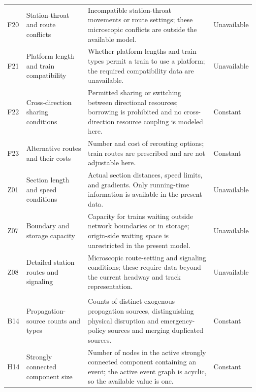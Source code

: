 \begin{longtable}{@{}>{\raggedright\arraybackslash}p{0.7cm}>{\raggedright\arraybackslash}p{3.0cm}>{\raggedright\arraybackslash}p{8.6cm}>{\raggedright\arraybackslash}p{1.9cm}@{}}
F20 & Station-throat and route conflicts & Incompatible station-throat movements or route settings; these microscopic conflicts are outside the available model. & Unavailable \\

F21 & Platform length and train compatibility & Whether platform lengths and train types permit a train to use a platform; the required compatibility data are unavailable. & Unavailable \\

F22 & Cross-direction sharing conditions & Permitted sharing or switching between directional resources; borrowing is prohibited and no cross-direction resource coupling is modeled here. & Constant \\

F23 & Alternative routes and their costs & Number and cost of rerouting options; train routes are prescribed and are not adjustable here. & Constant \\

Z01 & Section length and speed conditions & Actual section distances, speed limits, and gradients. Only running-time information is available in the present data. & Unavailable \\

Z07 & Boundary and storage capacity & Capacity for trains waiting outside network boundaries or in storage; origin-side waiting space is unrestricted in the present model. & Unavailable \\

Z08 & Detailed station routes and signaling & Microscopic route-setting and signaling conditions; these require data beyond the current headway and track representation. & Unavailable \\

\multicolumn{4}{@{}l}{\textbf{Delay propagation patterns}}\\*[2pt]

B14 & Propagation-source counts and types & Counts of distinct exogenous propagation sources, distinguishing physical disruption and emergency-policy sources and merging duplicated sources. & Constant \\

H14 & Strongly connected component size & Number of nodes in the active strongly connected component containing an event; the active event graph is acyclic, so the available value is one. & Constant \\

\end{longtable}

\endgroup
